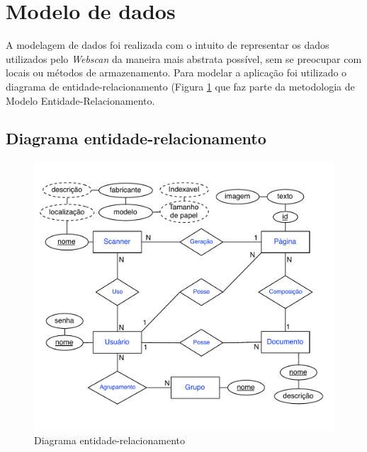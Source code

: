 
\section{Modelo de dados}
\label{sec:modelo_de_dados}

A modelagem de dados foi realizada com o intuito de representar os dados utilizados pelo {\it Webscan}
da maneira mais abstrata possível, sem se preocupar com locais ou métodos de armazenamento.
Para modelar a aplicação foi utilizado o diagrama de entidade-relacionamento (Figura \ref{fig:der}
que faz parte da metodologia de Modelo Entidade-Relacionamento. 

\subsection{Diagrama entidade-relacionamento}
\begin{figure}[ht]
 \centering
  \includegraphics[scale=0.75]{img/der.pdf}
  \caption {Diagrama entidade-relacionamento}
  \label{fig:der}
\end{figure}
